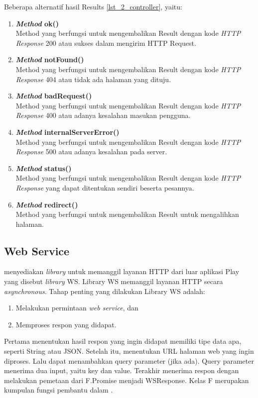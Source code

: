 Beberapa alternatif hasil Results \ref{lst_2_controller}, yaitu:
\begin{enumerate}
	\item \textbf{\textit{Method} ok()}\\ 
	Method yang berfungsi untuk mengembalikan Result dengan kode \textit{HTTP Response} 200 atau sukses dalam mengirim HTTP Request.
	\item \textbf{\textit{Method} notFound()}\\
	Method yang berfungsi untuk mengembalikan Result dengan  kode \textit{HTTP Response} 404 atau tidak ada halaman yang dituju.
	\item \textbf{\textit{Method} badRequest()}\\
	Method yang berfungsi untuk mengembalikan Result dengan kode \textit{HTTP Response} 400 atau adanya kesalahan masukan pengguna.
	\item \textbf{\textit{Method} internalServerError()}\\
	Method yang berfungsi untuk mengembalikan Result dengan kode \textit{HTTP Response} 500 atau adanya kesalahan pada server.
	\item \textbf{\textit{Method} status()}\\
	Method yang berfungsi untuk mengembalikan Result dengan kode \textit{HTTP Response} yang dapat ditentukan sendiri beserta pesannya.
	\item \textbf{\textit{Method} redirect()}\\
	Method yang berfungsi untuk mengembalikan Result untuk mengalihkan halaman.
\end{enumerate}

\subsection{Web Service}
\play menyediakan \textit{library} untuk memanggil layanan HTTP dari luar aplikasi Play yang disebut \textit{library} WS. Library WS memanggil layanan HTTP secara \textit{asynchronous}. Tahap penting yang dilakukan Library WS adalah:
\begin{enumerate}
	\item Melakukan permintaan \textit{web service}, dan
	\item Memproses respon yang didapat.
\end{enumerate}

Pertama menentukan hasil respon yang ingin didapat memiliki tipe data apa, seperti String atau JSON. Setelah itu, menentukan URL halaman web yang ingin diproses. Lalu dapat menambahkan query parameter (jika ada). Query parameter menerima dua input, yaitu key dan value. Terakhir menerima respon dengan melakukan pemetaan dari F.Promise menjadi WSResponse. Kelas F merupakan kumpulan fungsi pembantu dalam \play.

